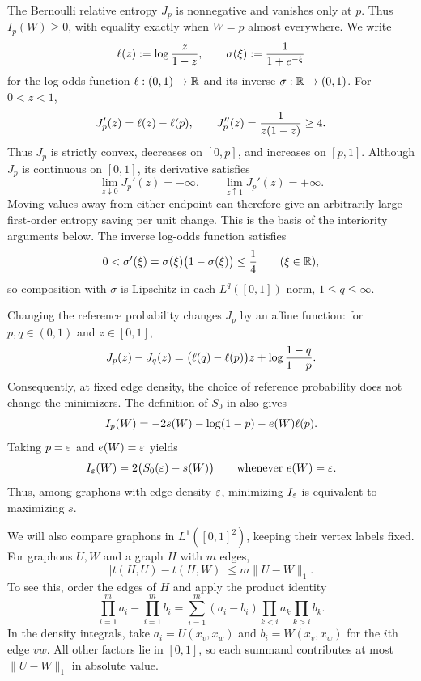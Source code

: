The Bernoulli relative entropy $J_p$ is nonnegative and vanishes only at
$p$.  Thus $I_p(W)\ge0$, with equality exactly when $W=p$ almost everywhere.
We write
\[
  \ell(z):=\log\frac z{1-z},
  \qquad
  \sigma(\xi):=\frac1{1+e^{-\xi}}
\]
for the log-odds function $\ell:(0,1)\to\mathbb R$ and its inverse
$\sigma:\mathbb R\to(0,1)$.  For $0<z<1$,
\begin{equation}\label{eq:entropy-derivatives}
  J_p'(z)=\ell(z)-\ell(p),
  \qquad
  J_p''(z)=\frac1{z(1-z)}\ge4.
\end{equation}
Thus $J_p$ is strictly convex, decreases on $[0,p]$, and increases on
$[p,1]$.  Although $J_p$ is continuous on $[0,1]$, its derivative satisfies
\begin{equation}\label{eq:entropy-endpoint-limits}
  \lim_{z\downarrow0}J_p'(z)=-\infty,
  \qquad \lim_{z\uparrow1}J_p'(z)=+\infty.
\end{equation}
Moving values away from either endpoint can therefore give an
arbitrarily large first-order entropy saving per unit change.
This is the basis of the interiority arguments below.
The inverse log-odds function satisfies
\begin{equation}\label{eq:logistic-derivative}
  0<\sigma'(\xi)=\sigma(\xi)\bigl(1-\sigma(\xi)\bigr)\le\frac14
  \qquad(\xi\in\mathbb R),
\end{equation}
so composition with $\sigma$ is Lipschitz in each $L^q([0,1])$ norm,
$1\le q\le\infty$.

Changing the reference probability changes $J_p$ by an affine function:
for $p,q\in(0,1)$ and $z\in[0,1]$,
\begin{equation}\label{eq:entropy-reference-change}
  J_p(z)-J_q(z)
  =\bigl(\ell(q)-\ell(p)\bigr)z+\log\frac{1-q}{1-p}.
\end{equation}
Consequently, at fixed edge density, the choice of reference probability
does not change the minimizers. The definition of $S_0$ in
 also gives
\[
  I_p(W)=-2s(W)-\log(1-p)-e(W)\ell(p).
\]
Taking $p=\varepsilon$ and $e(W)=\varepsilon$ yields
\begin{equation}\label{eq:entropy-identity}
  I_\varepsilon(W)=2\bigl(S_0(\varepsilon)-s(W)\bigr)\qquad\text{whenever }e(W)=\varepsilon.
\end{equation}
Thus, among graphons with edge density $\varepsilon$, minimizing $I_\varepsilon$
is equivalent to maximizing $s$.

We will also compare graphons in $L^1([0,1]^2)$, keeping their vertex
labels fixed.  For graphons $U,W$ and a graph $H$ with $m$ edges,
\begin{equation}\label{eq:density-l1-continuity}
  |t(H,U)-t(H,W)|\le m\|U-W\|_1.
\end{equation}
To see this, order the edges of $H$ and apply the product identity
\begin{equation}\label{eq:product-difference}
  \prod_{i=1}^m a_i-\prod_{i=1}^m b_i
  =\sum_{i=1}^m(a_i-b_i)
       \prod_{k<i}a_k\prod_{k>i}b_k.
\end{equation}
In the density integrals, take $a_i=U(x_v,x_w)$ and $b_i=W(x_v,x_w)$
for the $i$th edge $vw$.  All other factors lie in $[0,1]$, so each
summand contributes at most $\|U-W\|_1$ in absolute value.

